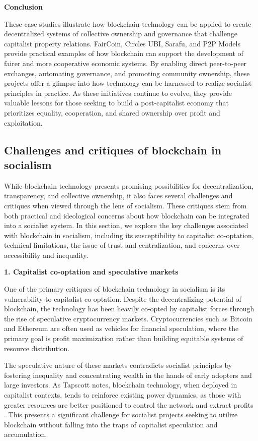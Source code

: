 \begin{refsection}
\textbf{Conclusion}

These case studies illustrate how blockchain technology can be applied to create decentralized systems of collective ownership and governance that challenge capitalist property relations. FairCoin, Circles UBI, Sarafu, and P2P Models provide practical examples of how blockchain can support the development of fairer and more cooperative economic systems. By enabling direct peer-to-peer exchanges, automating governance, and promoting community ownership, these projects offer a glimpse into how technology can be harnessed to realize socialist principles in practice. As these initiatives continue to evolve, they provide valuable lessons for those seeking to build a post-capitalist economy that prioritizes equality, cooperation, and shared ownership over profit and exploitation.

\subsection{Challenges and critiques of blockchain in socialism}

While blockchain technology presents promising possibilities for decentralization, transparency, and collective ownership, it also faces several challenges and critiques when viewed through the lens of socialism. These critiques stem from both practical and ideological concerns about how blockchain can be integrated into a socialist system. In this section, we explore the key challenges associated with blockchain in socialism, including its susceptibility to capitalist co-optation, technical limitations, the issue of trust and centralization, and concerns over accessibility and inequality.

\textbf{1. Capitalist co-optation and speculative markets}

One of the primary critiques of blockchain technology in socialism is its vulnerability to capitalist co-optation. Despite the decentralizing potential of blockchain, the technology has been heavily co-opted by capitalist forces through the rise of speculative cryptocurrency markets. Cryptocurrencies such as Bitcoin and Ethereum are often used as vehicles for financial speculation, where the primary goal is profit maximization rather than building equitable systems of resource distribution.

The speculative nature of these markets contradicts socialist principles by fostering inequality and concentrating wealth in the hands of early adopters and large investors. As Tapscott notes, blockchain technology, when deployed in capitalist contexts, tends to reinforce existing power dynamics, as those with greater resources are better positioned to control the network and extract profits \cite[pp.~112-115]{tapscott2016}. This presents a significant challenge for socialist projects seeking to utilize blockchain without falling into the traps of capitalist speculation and accumulation.


\end{refsection}
